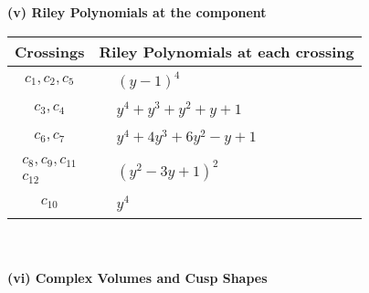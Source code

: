 \documentclass[1p]{elsarticle_modified}
\theoremstyle{definition}
\begin{document}
\newpage\renewcommand{\arraystretch}{1}
\flushleft \textbf{(v) Riley Polynomials at the component}\newline \\
\begin{tabular}{m{50pt}|m{274pt}}
Crossings & \hspace{64pt}Riley Polynomials at each crossing \\
\hline $$\begin{aligned}c_{1},c_{2},c_{5}\end{aligned}$$&$\begin{aligned}
&(y-1)^4
\end{aligned}$\\
\hline $$\begin{aligned}c_{3},c_{4}\end{aligned}$$&$\begin{aligned}
&y^4+y^3+y^2+y+1
\end{aligned}$\\
\hline $$\begin{aligned}c_{6},c_{7}\end{aligned}$$&$\begin{aligned}
&y^4+4 y^3+6 y^2- y+1
\end{aligned}$\\
\hline $$\begin{aligned}c_{8},c_{9},c_{11}\\c_{12}\end{aligned}$$&$\begin{aligned}
&(y^2-3 y+1)^2
\end{aligned}$\\
\hline $$\begin{aligned}c_{10}\end{aligned}$$&$\begin{aligned}
&y^4
\end{aligned}$\\
\hline
\end{tabular}\\~\\
\newpage\flushleft \textbf{(vi) Complex Volumes and Cusp Shapes}
\end{document}
